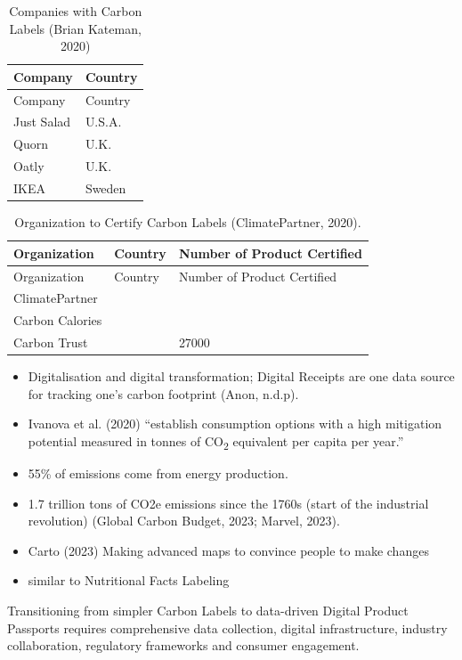 \documentclass[
  letterpaper,
  DIV=11,
  numbers=noendperiod]{scrartcl}
\begin{document}
\begin{longtable}[]{@{}ll@{}}
\caption{Companies with Carbon Labels (Brian Kateman,
2020)}\tabularnewline
\toprule\noalign{}
Company & Country \\
\midrule\noalign{}
\endfirsthead
\toprule\noalign{}
Company & Country \\
\midrule\noalign{}
\endhead
\bottomrule\noalign{}
\endlastfoot
Just Salad & U.S.A. \\
Quorn & U.K. \\
Oatly & U.K. \\
IKEA & Sweden \\
\end{longtable}

\begin{longtable}[]{@{}lll@{}}
\caption{Organization to Certify Carbon Labels (ClimatePartner,
2020).}\tabularnewline
\toprule\noalign{}
Organization & Country & Number of Product Certified \\
\midrule\noalign{}
\endfirsthead
\toprule\noalign{}
Organization & Country & Number of Product Certified \\
\midrule\noalign{}
\endhead
\bottomrule\noalign{}
\endlastfoot
ClimatePartner & & \\
Carbon Calories & & \\
Carbon Trust & & 27000 \\
\end{longtable}

\begin{itemize}
\item
  Digitalisation and digital transformation; Digital Receipts are one
  data source for tracking one's carbon footprint (Anon, n.d.p).
\item
  Ivanova et al. (2020) ``establish consumption options with a high
  mitigation potential measured in tonnes of CO\textsubscript{2}
  equivalent per capita per year.''
\item
  55\% of emissions come from energy production.
\item
  1.7 trillion tons of CO2e emissions since the 1760s (start of the
  industrial revolution) (Global Carbon Budget, 2023; Marvel, 2023).
\item
  Carto (2023) Making advanced maps to convince people to make changes
\item
  similar to Nutritional Facts Labeling
\end{itemize}

Transitioning from simpler Carbon Labels to data-driven Digital Product
Passports requires comprehensive data collection, digital
infrastructure, industry collaboration, regulatory frameworks and
consumer engagement.
\end{document}
